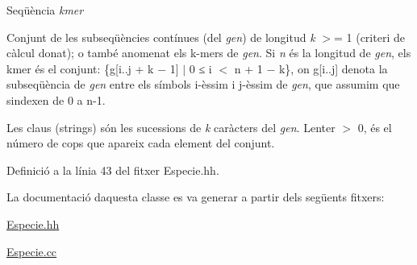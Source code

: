 Seqüència {\itshape kmer} 

Conjunt de les subseqüències contínues (del {\itshape gen}) de longitud {\itshape k} $>$= 1 (criteri de càlcul donat); o també anomenat els k-\/mers de {\itshape gen}. Si {\itshape n} és la longitud de {\itshape gen}, els kmer és el conjunt\+: \{g\mbox{[}i..j + k − 1\mbox{]} $\vert$ 0 ≤ i $<$ n + 1 − k\}, on g\mbox{[}i..j\mbox{]} denota la subseqüència de {\itshape gen} entre els símbols i-\/èssim i j-\/èssim de {\itshape gen}, que assumim que s\textquotesingle{}indexen de 0 a n-\/1.

Les claus (strings) són les sucessions de {\itshape k} caràcters del {\itshape gen}. L\textquotesingle{}enter $>$ 0, és el número de cops que apareix cada element del conjunt. 

Definició a la línia 43 del fitxer Especie.\+hh.



La documentació d\textquotesingle{}aquesta classe es va generar a partir dels següents fitxers\+:\begin{DoxyCompactItemize}
\item 
\hyperlink{_especie_8hh}{Especie.\+hh}\item 
\hyperlink{_especie_8cc}{Especie.\+cc}\end{DoxyCompactItemize}
